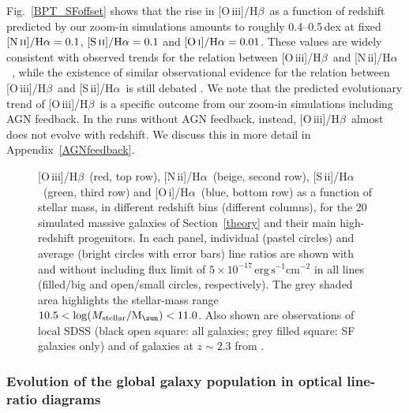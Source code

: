 \documentclass[fleqn,usenatbib]{mnras}
\newcommand{\Msun}{\hbox{M$_\sun$}}
\newcommand{\oiiihb}{\hbox{[O\,{\sc iii}]/H$\beta$}}
\newcommand{\niiha}{\hbox{[N\,{\sc ii}]/H$\alpha$}}
\newcommand{\siiha}{\hbox{[S\,{\sc ii}]/H$\alpha$}}
\newcommand{\oiha}{\hbox{[O\,{\sc i}]/H$\alpha$}}
\begin{document}
Fig.~\ref{BPT_SFoffset} shows that the rise in \oiiihb\ as a function of redshift
predicted by our zoom-in simulations amounts to roughly 
0.4--0.5\,dex at fixed $\niiha=0.1$, $\siiha=0.1$ and $\oiha=0.01$. These values
are widely consistent with observed trends for the relation between \oiiihb\ 
and \niiha\ \citep[e.g.,][]{Steidel14,Kashino17,Strom17}, while the existence of
similar observational evidence for the relation between \oiiihb\ and \siiha\ is 
still debated \citep[e.g.,][see also Section~\ref{discussion}]{Shapley15,Kashino17}. 
We note that the predicted evolutionary trend of \oiiihb\ is a specific outcome 
from our zoom-in simulations including AGN feedback. In the runs without 
AGN feedback, instead, \oiiihb\ almost does not evolve with redshift. We discuss 
this in more detail in Appendix~\ref{AGNfeedback}.

\begin{figure*}
\caption{\oiiihb\ (red, top row), \niiha\ (beige, second row), \siiha\ (green, third row) and 
\oiha\ (blue, bottom row) as a function of stellar mass, in different redshift bins 
(different columns), for the 20 simulated massive galaxies of Section~\ref{theory} and their 
main high-redshift progenitors. In each panel, individual (pastel circles) and 
average (bright circles with error bars) line ratios are shown with and without
including flux limit of $\mathrm{5\times 10^{-17}\,erg\,s^{-1}cm^{-2}}$ 
in all lines (filled/big and open/small circles, respectively). The grey
shaded area highlights the stellar-mass range $10.5<\log (M_{\rm stellar}/\Msun)<11.0$.
Also shown are observations of local SDSS (black open square: all galaxies; grey filled
square: SF galaxies only) and of galaxies at $z\sim2.3$ from 
\citet[black open triangles]{Steidel14}.} \label{Lineratios_mass}        
\end{figure*}

\subsubsection{Evolution of the global galaxy population in optical line-ratio diagrams}\label{avgratios}
\end{document}
